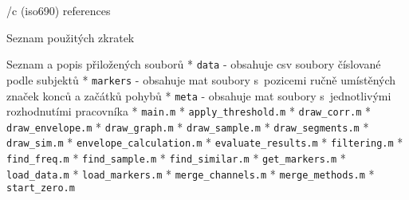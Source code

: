 \bibchap
    \usebib/c (iso690) references

 Seznam použitých zkratek
    \makeglos

 Seznam a popis přiložených souborů
    \begitems
    * {\tt data} - obsahuje csv soubory číslované podle subjektů
    \begitems
    * {\tt markers} - obsahuje mat soubory s~pozicemi ručně umístěných značek konců a začátků pohybů
    \enditems
    * {\tt meta} - obsahuje mat soubory s~jednotlivými rozhodnutími pracovníka
    * {\tt main.m}
    * {\tt apply_threshold.m}
    * {\tt draw_corr.m}
    * {\tt draw_envelope.m}
    * {\tt draw_graph.m}
    * {\tt draw_sample.m}
    * {\tt draw_segments.m}
    * {\tt draw_sim.m}
    * {\tt envelope_calculation.m}
    * {\tt evaluate_results.m}
    * {\tt filtering.m}
    * {\tt find_freq.m}
    * {\tt find_sample.m}
    * {\tt find_similar.m}
    * {\tt get_markers.m}
    * {\tt load_data.m}
    * {\tt load_markers.m}
    * {\tt merge_channels.m}
    * {\tt merge_methods.m}
    * {\tt start_zero.m}
    \enditems
